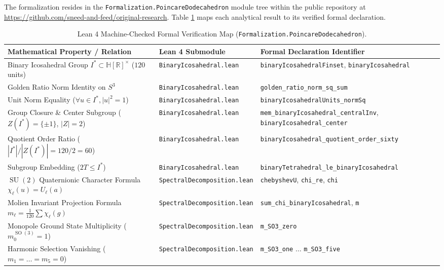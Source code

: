 \documentclass[11pt,a4paper]{article}
\theoremstyle{definition}
\DeclareMathOperator{\SU}{SU}
\DeclareMathOperator{\SO}{SO}
\begin{document}
The formalization resides in the \texttt{Formalization.PoincareDodecahedron} module tree within the public repository at \url{https://github.com/sneed-and-feed/original-research}. Table \ref{tab:lean} maps each analytical result to its verified formal declaration.

\begin{table}[htbp]
\centering
\footnotesize
\caption{Lean 4 Machine-Checked Formal Verification Map (\texttt{Formalization.PoincareDodecahedron}).}
\label{tab:lean}
\vspace{0.5em}
\begin{tabularx}{\textwidth}{llX}
\toprule
\textbf{Mathematical Property / Relation} & \textbf{Lean 4 Submodule} & \textbf{Formal Declaration Identifier} \\
\midrule
Binary Icosahedral Group $I^* \subset \mathbb{H}[\mathbb{R}]^\times$ ($120$ units) & \texttt{BinaryIcosahedral.lean} & \texttt{binaryIcosahedralFinset}, \texttt{binaryIcosahedral} \\
Golden Ratio Norm Identity on $S^3$ & \texttt{BinaryIcosahedral.lean} & \texttt{golden\_ratio\_norm\_sq\_sum} \\
Unit Norm Equality ($\forall u \in I^*, |u|^2 = 1$) & \texttt{BinaryIcosahedral.lean} & \texttt{binaryIcosahedralUnits\_normSq} \\
Group Closure \& Center Subgroup ($Z(I^*)=\{\pm 1\}$, $|Z|=2$) & \texttt{BinaryIcosahedral.lean} & \texttt{mem\_binaryIcosahedral\_centralInv}, \texttt{binaryIcosahedral\_center} \\
Quotient Order Ratio ($|I^*| / |Z(I^*)| = 120/2 = 60$) & \texttt{BinaryIcosahedral.lean} & \texttt{binaryIcosahedral\_quotient\_order\_sixty} \\
Subgroup Embedding ($2T \le I^*$) & \texttt{BinaryIcosahedral.lean} & \texttt{binaryTetrahedral\_le\_binaryIcosahedral} \\
$\SU(2)$ Quaternionic Character Formula $\chi_\ell(u) = U_\ell(a)$ & \texttt{SpectralDecomposition.lean} & \texttt{chebyshevU}, \texttt{chi\_re}, \texttt{chi} \\
Molien Invariant Projection Formula $m_\ell = \frac{1}{120} \sum \chi_\ell(g)$ & \texttt{SpectralDecomposition.lean} & \texttt{sum\_chi\_binaryIcosahedral}, \texttt{m} \\
Monopole Ground State Multiplicity ($m_0^{\SO(3)} = 1$) & \texttt{SpectralDecomposition.lean} & \texttt{m\_SO3\_zero} \\
Harmonic Selection Vanishing ($m_1 = \dots = m_5 = 0$) & \texttt{SpectralDecomposition.lean} & \texttt{m\_SO3\_one} $\dots$ \texttt{m\_SO3\_five} \\

\end{tabularx}
\end{table}
\end{document}
